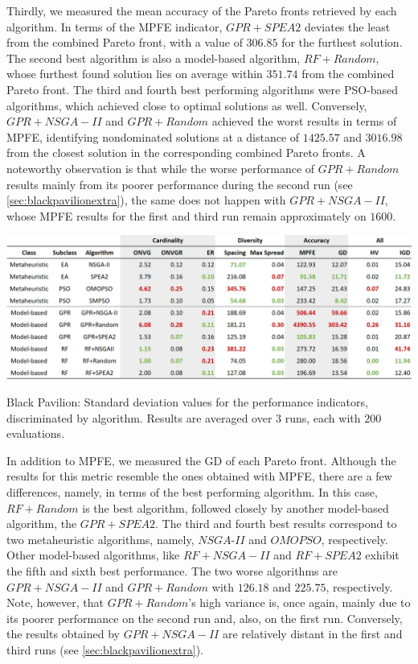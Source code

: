 Thirdly, we measured the mean accuracy of the Pareto fronts retrieved by each algorithm. In terms of the \ac{MPFE} indicator, $GPR+SPEA2$ deviates the least from the combined Pareto front, with a value of $306.85$ for the furthest solution. The second best algorithm is also a model-based algorithm, $RF+Random$, whose furthest found solution lies on average within $351.74$ from the combined Pareto front. The third and fourth best performing algorithms were \ac{PSO}-based algorithms, which achieved close to optimal solutions as well. Conversely, $GPR+NSGA-II$ and $GPR+Random$ achieved the worst results in terms of \ac{MPFE}, identifying nondominated solutions at a distance of $1425.57$ and $3016.98$ from the closest solution in the corresponding combined Pareto fronts. A noteworthy observation is that while the worse performance of $GPR+Random$ results mainly from its poorer performance during the second run (see \cref{sec:blackpavilionextra}), the same does not happen with $GPR+NSGA-II$, whose \ac{MPFE} results for the first and third run remain approximately on $1600$. 

\begin{table}[htbp]
	\centering
	\includegraphics[width=\textwidth]{Images/Evaluation/BlackPavilion/Results_Std_20190416.PNG}
	\caption[Black Pavilion: Standard deviations of the performance indicators results, discriminated by each algorithm]{Black Pavilion: Standard deviation values for the performance indicators, discriminated by algorithm. Results are averaged over $3$ runs, each with $200$ evaluations.}
	\label{table:blackpavilionstd}
\end{table}

In addition to \ac{MPFE}, we measured the \ac{GD} of each Pareto front. Although the results for this metric resemble the ones obtained with \ac{MPFE}, there are a few differences, namely, in terms of the best performing algorithm. In this case, $RF+Random$ is the best algorithm, followed closely by another model-based algorithm, the $GPR+SPEA2$. The third and fourth best results correspond to two metaheuristic algorithms, namely, $NSGA$-$II$ and $OMOPSO$, respectively. Other model-based algorithms, like $RF+NSGA-II$ and $RF+SPEA2$ exhibit the fifth and sixth best performance. The two worse algorithms are $GPR+NSGA-II$ and $GPR+Random$ with $126.18$ and $225.75$, respectively. Note, however, that $GPR+Random$'s high variance is, once again, mainly due to its poorer performance on the second run and, also, on the first run. Conversely, the results obtained by $GPR+NSGA-II$ are relatively distant in the first and third runs (see \cref{sec:blackpavilionextra}).

